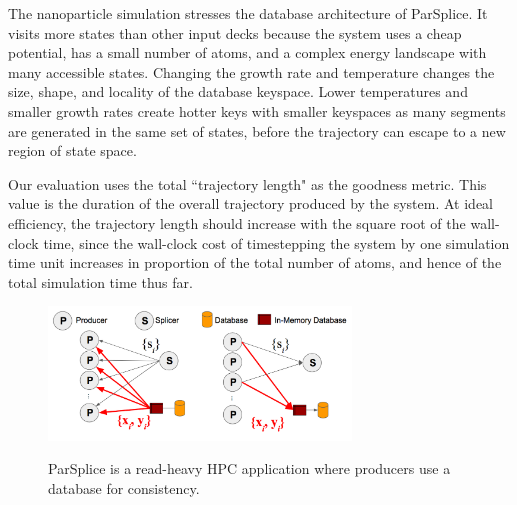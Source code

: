 The nanoparticle simulation stresses the database architecture of ParSplice. It
visits more states than other input decks because the system uses a cheap
potential, has a small number of atoms, and a complex energy landscape with
many accessible states. Changing the growth rate and temperature changes the
size, shape, and locality of the database keyspace. Lower temperatures and
smaller growth rates create hotter keys with smaller keyspaces as many segments
are generated in the same set of states, before the trajectory can escape to a
new region of state space.

Our evaluation uses the total ``trajectory length" as the goodness metric. This
value is the duration of the overall trajectory produced by the system. At
ideal efficiency, the trajectory length should increase with the square root of
the wall-clock time, since the wall-clock cost of timestepping the system by
one simulation time unit increases in proportion of the total number of atoms,
and hence of the total simulation time thus far. 


\begin{figure}[t]
  \noindent\includegraphics[width=19pc,angle=0]{figures/arch-parsplice.png}\\
  \caption{ParSplice is a read-heavy HPC application where producers use a
  database for consistency. \label{fig:arch-parsplice}}
\end{figure}

